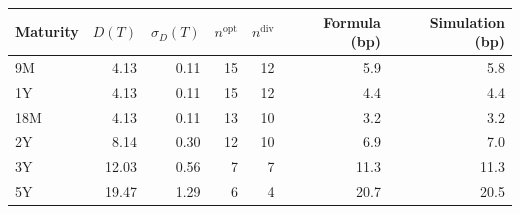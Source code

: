 {\small\begin{tabular}{lrrrrrr}
\toprule
Maturity & $D(T)$ & $\sigma_D(T)$ & $n^{\mathrm{opt}}$ & $n^{\mathrm{div}}$ & Formula (bp) & Simulation (bp) \\
\midrule
9M & \num{4.13} & \num{0.11} & 15 & 12 & \num{5.9} & \num{5.8} \\
1Y & \num{4.13} & \num{0.11} & 15 & 12 & \num{4.4} & \num{4.4} \\
18M & \num{4.13} & \num{0.11} & 13 & 10 & \num{3.2} & \num{3.2} \\
2Y & \num{8.14} & \num{0.30} & 12 & 10 & \num{6.9} & \num{7.0} \\
3Y & \num{12.03} & \num{0.56} & 7 & 7 & \num{11.3} & \num{11.3} \\
5Y & \num{19.47} & \num{1.29} & 6 & 4 & \num{20.7} & \num{20.5} \\
\bottomrule
\end{tabular}}
